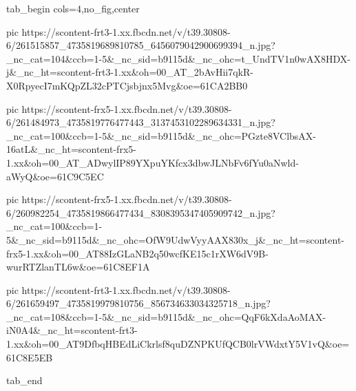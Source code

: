  
 
 
 
 


\ifcmt
  tab_begin cols=4,no_fig,center

     pic https://scontent-frt3-1.xx.fbcdn.net/v/t39.30808-6/261515857_4735819689810785_6456079042900699394_n.jpg?_nc_cat=104&ccb=1-5&_nc_sid=b9115d&_nc_ohc=t_UndTV1n0wAX8HDX-j&_nc_ht=scontent-frt3-1.xx&oh=00_AT_2bAvHii7qkR-X0RpyecI7mKQpZL32cPTCjsbjnx5Mvg&oe=61CA2BB0

     pic https://scontent-frx5-1.xx.fbcdn.net/v/t39.30808-6/261484973_4735819776477443_3137453102289634331_n.jpg?_nc_cat=100&ccb=1-5&_nc_sid=b9115d&_nc_ohc=PGzte8VClbsAX-16atL&_nc_ht=scontent-frx5-1.xx&oh=00_AT_ADwylIP89YXpuYKfcx3dbwJLNbFv6fYu0aNwld-aWyQ&oe=61C9C5EC

     pic https://scontent-frx5-1.xx.fbcdn.net/v/t39.30808-6/260982254_4735819866477434_8308395347405909742_n.jpg?_nc_cat=100&ccb=1-5&_nc_sid=b9115d&_nc_ohc=OfW9UdwVyyAAX830x_j&_nc_ht=scontent-frx5-1.xx&oh=00_AT88IzGLaNB2q50wcfKE15c1rXW6dV9B-wurRTZlanTL6w&oe=61C8EF1A

     pic https://scontent-frt3-1.xx.fbcdn.net/v/t39.30808-6/261659497_4735819979810756_856734633034325718_n.jpg?_nc_cat=108&ccb=1-5&_nc_sid=b9115d&_nc_ohc=QqF6kXdaAoMAX-iN0A4&_nc_ht=scontent-frt3-1.xx&oh=00_AT9DfbqHBEdLiCkrlsf8quDZNPKUfQCB0lrVWdxtY5V1vQ&oe=61C8E5EB

  tab_end
\fi
